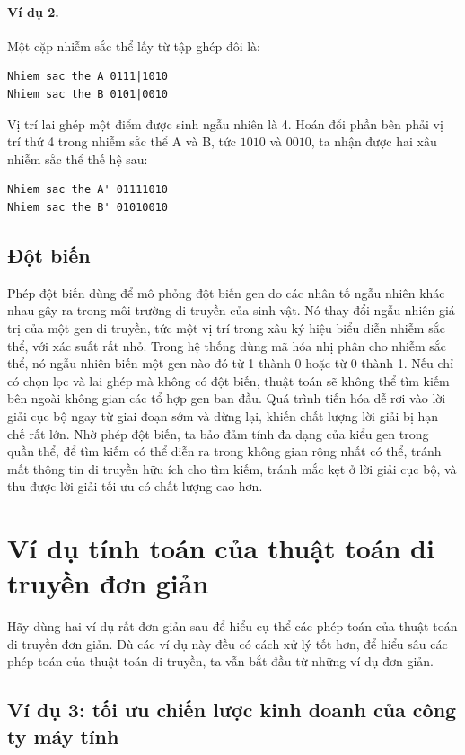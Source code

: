 \documentclass[11pt]{article}
\begin{document}
\paragraph{Ví dụ 2.}
Một cặp nhiễm sắc thể lấy từ tập ghép đôi là:
\begin{verbatim}
Nhiem sac the A 0111|1010
Nhiem sac the B 0101|0010
\end{verbatim}
Vị trí lai ghép một điểm được sinh ngẫu nhiên là 4. Hoán đổi phần bên phải vị
trí thứ 4 trong nhiễm sắc thể A và B, tức \(1010\) và \(0010\), ta nhận được
hai xâu nhiễm sắc thể thế hệ sau:
\begin{verbatim}
Nhiem sac the A' 01111010
Nhiem sac the B' 01010010
\end{verbatim}

\subsection{Đột biến}

Phép đột biến dùng để mô phỏng đột biến gen do các nhân tố ngẫu nhiên khác
nhau gây ra trong môi trường di truyền của sinh vật. Nó thay đổi ngẫu nhiên
giá trị của một gen di truyền, tức một vị trí trong xâu ký hiệu biểu diễn
nhiễm sắc thể, với xác suất rất nhỏ. Trong hệ thống dùng mã hóa nhị phân cho
nhiễm sắc thể, nó ngẫu nhiên biến một gen nào đó từ 1 thành 0 hoặc từ 0
thành 1. Nếu chỉ có chọn lọc và lai ghép mà không có đột biến, thuật toán sẽ
không thể tìm kiếm bên ngoài không gian các tổ hợp gen ban đầu. Quá trình
tiến hóa dễ rơi vào lời giải cục bộ ngay từ giai đoạn sớm và dừng lại, khiến
chất lượng lời giải bị hạn chế rất lớn. Nhờ phép đột biến, ta bảo đảm tính
đa dạng của kiểu gen trong quần thể, để tìm kiếm có thể diễn ra trong không
gian rộng nhất có thể, tránh mất thông tin di truyền hữu ích cho tìm kiếm,
tránh mắc kẹt ở lời giải cục bộ, và thu được lời giải tối ưu có chất lượng
cao hơn.

\section{Ví dụ tính toán của thuật toán di truyền đơn giản}

Hãy dùng hai ví dụ rất đơn giản sau để hiểu cụ thể các phép toán của thuật
toán di truyền đơn giản. Dù các ví dụ này đều có cách xử lý tốt hơn, để hiểu
sâu các phép toán của thuật toán di truyền, ta vẫn bắt đầu từ những ví dụ đơn
giản.

\subsection{Ví dụ 3: tối ưu chiến lược kinh doanh của công ty máy tính}
\end{document}
